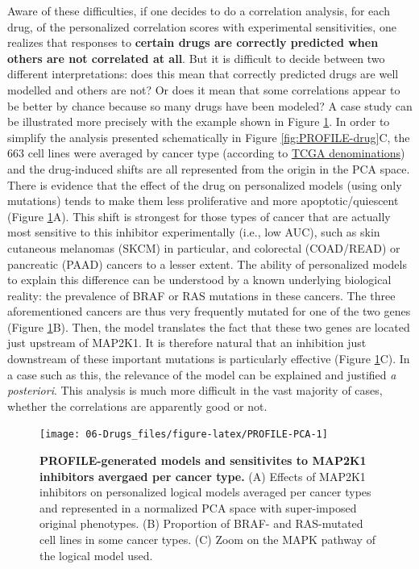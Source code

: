 \documentclass[a4paper,12pt,twoside,onecolumn,openright,final,oldfontcommands]{memoir}
\begin{document}
Aware of these difficulties, if one decides to do a correlation
analysis, for each drug, of the personalized correlation scores with
experimental sensitivities, one realizes that responses to
\textbf{certain drugs are correctly predicted when others are not
correlated at all}. But it is difficult to decide between two different
interpretations: does this mean that correctly predicted drugs are well
modelled and others are not? Or does it mean that some correlations
appear to be better by chance because so many drugs have been modeled? A
case study can be illustrated more precisely with the example shown in
Figure \ref{fig:PROFILE-PCA}. In order to simplify the analysis
presented schematically in Figure \ref{fig:PROFILE-drug}C, the 663 cell
lines were averaged by cancer type (according to
\href{https://gdc.cancer.gov/resources-tcga-users/tcga-code-tables/tcga-study-abbreviations}{TCGA
denominations}) and the drug-induced shifts are all represented from the
origin in the PCA space. There is evidence that the effect of the drug
on personalized models (using only mutations) tends to make them less
proliferative and more apoptotic/quiescent (Figure
\ref{fig:PROFILE-PCA}A). This shift is strongest for those types of
cancer that are actually most sensitive to this inhibitor experimentally
(i.e., low AUC), such as skin cutaneous melanomas (SKCM) in particular,
and colorectal (COAD/READ) or pancreatic (PAAD) cancers to a lesser
extent. The ability of personalized models to explain this difference
can be understood by a known underlying biological reality: the
prevalence of BRAF or RAS mutations in these cancers. The three
aforementioned cancers are thus very frequently mutated for one of the
two genes (Figure \ref{fig:PROFILE-PCA}B). Then, the model translates
the fact that these two genes are located just upstream of MAP2K1. It is
therefore natural that an inhibition just downstream of these important
mutations is particularly effective (Figure \ref{fig:PROFILE-PCA}C). In
a case such as this, the relevance of the model can be explained and
justified \emph{a posteriori}. This analysis is much more difficult in
the vast majority of cases, whether the correlations are apparently good
or not.

\begin{figure}

{\centering \texttt{[image: 06-Drugs\_files/figure-latex/PROFILE-PCA-1]} 

}

\caption[PROFILE-generated models and sensitivites to MAP2K1  inhibitors avergaed per cancer type]{\textbf{PROFILE-generated models and
sensitivites to MAP2K1 inhibitors avergaed per cancer type.} (A) Effects
of MAP2K1 inhibitors on personalized logical models averaged per cancer
types and represented in a normalized PCA space with super-imposed
original phenotypes. (B) Proportion of BRAF- and RAS-mutated cell lines
in some cancer types. (C) Zoom on the MAPK pathway of the logical model
used.}\label{fig:PROFILE-PCA}
\end{figure}
\end{document}
